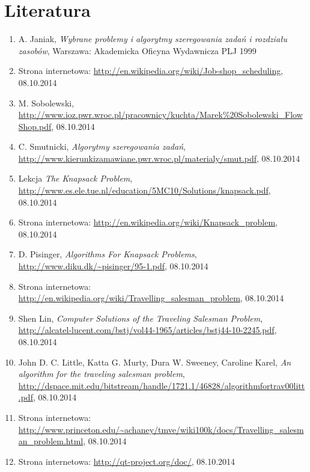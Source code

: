 \documentclass[eng,printmode]{mgr}
\begin{document}
\chapter{Literatura}
\begin{enumerate}

\item {A. Janiak, \emph{Wybrane problemy i algorytmy szeregowania  zadań i rozdziału zasobów}, Warszawa: Akademicka Oficyna Wydawnicza PLJ 1999}

\item {Strona internetowa: \url{http://en.wikipedia.org/wiki/Job-shop_scheduling}, 08.10.2014}

\item {M. Sobolewski, \url{http://www.ioz.pwr.wroc.pl/pracownicy/kuchta/Marek%20Sobolewski_FlowShop.pdf}, 08.10.2014}

\item {C. Smutnicki, \emph{Algorytmy szeregowania zadań}, \url{http://www.kierunkizamawiane.pwr.wroc.pl/materialy/smut.pdf}, 08.10.2014}

\item {Lekcja \emph{The Knapsack Problem}, \url{http://www.es.ele.tue.nl/education/5MC10/Solutions/knapsack.pdf}, 08.10.2014}

\item {Strona internetowa: \url{http://en.wikipedia.org/wiki/Knapsack_problem}, 08.10.2014}

\item {D. Pisinger, \emph{Algorithms For Knapsack Problems}, \url{http://www.diku.dk/~pisinger/95-1.pdf}, 08.10.2014}

\item {Strona internetowa: \url{http://en.wikipedia.org/wiki/Travelling_salesman_problem}, 08.10.2014}

\item {Shen Lin, \emph{Computer Solutions of the Traveling Salesman Problem}, \url{http://alcatel-lucent.com/bstj/vol44-1965/articles/bstj44-10-2245.pdf}, 08.10.2014}

\item {John D. C. Little, Katta G. Murty, Dura W. Sweeney, Caroline Karel, \emph{An algorithm for the traveling salesman problem}, \url{http://dspace.mit.edu/bitstream/handle/1721.1/46828/algorithmfortrav00litt.pdf}, 08.10.2014}

\item {Strona internetowa: \url{http://www.princeton.edu/~achaney/tmve/wiki100k/docs/Travelling_salesman_problem.html}, 08.10.2014}

\item {Strona internetowa: \url{http://qt-project.org/doc/}, 08.10.2014}

\end{enumerate}
\end{document}
